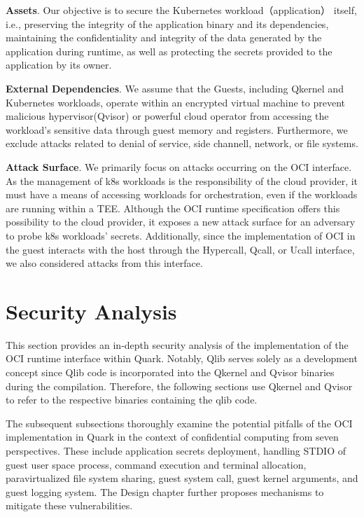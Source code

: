\textbf{Assets}. Our objective is to secure the Kubernetes workload（application） itself, i.e., preserving the integrity of the application binary and its dependencies, maintaining the confidentiality and integrity of the data generated by the 
application during runtime, as well as protecting the secrets provided to the application by its owner.

\textbf{External Dependencies}. We assume that the Guests, including Qkernel and Kubernetes workloads, operate within an encrypted virtual machine to prevent malicious hypervisor(Qvisor) or powerful cloud operator from accessing the workload’s 
sensitive data through guest memory and registers. Furthermore, we exclude attacks related to denial of service\cite*{DOS_ATTACK}, side channell\cite*{217454}, 
network, or file systems.

\textbf{Attack Surface}. We primarily focus on attacks occurring on the OCI interface\cite*{oci-runtime-spec}. As the management of k8s workloads is the responsibility of the cloud provider, it must have a means of accessing workloads for 
orchestration, even if the workloads are running within a TEE. Although the OCI runtime specification offers this possibility to the cloud provider, it exposes a new attack surface for an adversary to probe k8s workloads’ secrets. Additionally, 
since the implementation of OCI in the guest interacts with the host through the Hypercall, Qcall, or Ucall interface, we also considered attacks from this interface.

\section{Security Analysis}
\label{sec:security_analysis}

This section provides an in-depth security analysis of the implementation of the OCI runtime interface within Quark.  Notably, Qlib serves solely as a development concept since Qlib code is incorporated into the Qkernel and Qvisor binaries during 
the compilation. Therefore, the following sections use Qkernel and Qvisor to refer to the respective binaries containing the qlib code.

The subsequent subsections thoroughly examine the potential pitfalls of the OCI implementation in Quark in the context of confidential computing from seven perspectives. These include application secrets deployment, handling  STDIO of guest user 
space process, command execution and terminal allocation, paravirtualized file system sharing, guest system call,  guest kernel arguments, and guest logging system. The Design chapter further proposes mechanisms to mitigate these vulnerabilities.

